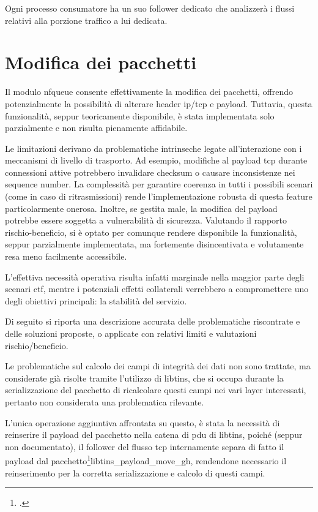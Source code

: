 Ogni processo consumatore ha un suo follower dedicato che analizzerà i flussi relativi alla porzione traffico a lui dedicata.

\section{Modifica dei pacchetti}

Il modulo \gls{nfqueue} consente effettivamente la modifica dei pacchetti, offrendo potenzialmente la possibilità di alterare header
\gls{ip}/\gls{tcp} e payload. Tuttavia, questa funzionalità, seppur teoricamente disponibile, è stata implementata solo parzialmente e non risulta pienamente affidabile.

Le limitazioni derivano da problematiche intrinseche legate all’interazione con i meccanismi di livello di trasporto. Ad esempio, modifiche al payload \gls{tcp} durante connessioni attive potrebbero invalidare checksum o causare inconsistenze nei \gls{seq}uence number. La complessità per garantire coerenza in tutti i possibili scenari (come in caso di ritrasmissioni) rende l’implementazione robusta di questa feature particolarmente onerosa. Inoltre, se gestita male, la modifica del payload potrebbe essere soggetta a vulnerabilità di sicurezza. Valutando il rapporto rischio-beneficio, si è optato per comunque rendere disponibile la funzionalità, seppur parzialmente implementata, ma fortemente disincentivata e volutamente resa meno facilmente accessibile.

L’effettiva necessità operativa risulta infatti marginale nella maggior parte degli scenari \gls{ctf}, mentre i potenziali effetti collaterali verrebbero a compromettere uno degli obiettivi principali: la stabilità del servizio.

Di seguito si riporta una descrizione accurata delle problematiche riscontrate e delle soluzioni proposte, o applicate con relativi limiti e valutazioni rischio/beneficio.

Le problematiche sul calcolo dei campi di integrità dei dati non sono trattate, ma considerate già risolte tramite l'utilizzo di libtins, che si occupa durante la serializzazione del pacchetto di ricalcolare questi campi nei vari layer interessati, pertanto non considerata una problematica rilevante.

L'unica operazione aggiuntiva affrontata su questo, è stata la necessità di reinserire il payload del pacchetto nella catena di \gls{pdu} di libtins, poiché (seppur non documentato), il follower del flusso \gls{tcp} internamente separa di fatto il payload dal pacchetto\footcite{Libtins, istruzione per la separazione del payload nel follower (std::move del payload)}{libtins_payload_move_gh}, rendendone necessario il reinserimento per la corretta serializzazione e calcolo di questi campi.

